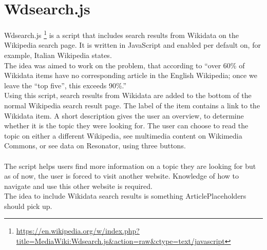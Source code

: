 \section{Wdsearch.js}
Wdsearch.js \footnote{\url{https://en.wikipedia.org/w/index.php?title=MediaWiki:Wdsearch.js&action=raw&ctype=text/javascript}} is a script that includes search results from Wikidata on the Wikipedia search page. It is written in JavaScript and enabled per default on, for example, Italian Wikipedia \citet{gerardm:01} states. \\
The idea was aimed to work on the problem, that according to \citet{manske:01} ``over 60\% of Wikidata items have no corresponding article in the English Wikipedia; once we leave the “top five”, this exceeds 90\%.'' \\
Using this script, search results from Wikidata are added to the bottom of the normal Wikipedia search result page. The label of the item contains a link to the Wikidata item. A short description gives the user an overview, to determine whether it is the topic they were looking for. The user can choose to read the topic on either a different Wikipedia, see multimedia content on Wikimedia Commons, or see data on Resonator, using three buttons. \\
\\
The script helps users find more information on a topic they are looking for but as of now, the user is forced to visit another website. Knowledge of how to navigate and use this other website is required. \\
The idea to include Wikidata search results is something ArticlePlaceholders should pick up.